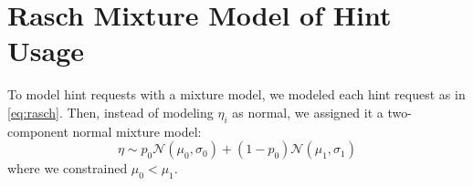 \documentclass{article}\usepackage[]{graphicx}\usepackage[]{color}
\begin{document}





\newpage
\appendix

\section{Rasch Mixture Model of Hint Usage}

To model hint requests with a mixture model, we modeled each hint
request as in \eqref{eq:rasch}.
Then, instead of modeling $\eta_i$ as normal, we assigned it a
two-component normal mixture model:
\begin{equation*}
\eta\sim
p_0\mathcal{N}(\mu_0,\sigma_0)+(1-p_0)\mathcal{N}(\mu_1,\sigma_1)
\end{equation*}
where we constrained $\mu_0<\mu_1$.
\end{document}
